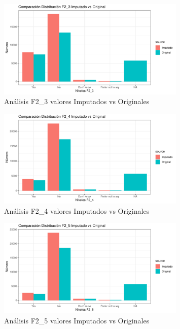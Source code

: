 \documentclass[a4paper, 11pt]{article}
\begin{document}
\begin{figure}[ht]
    \centering
    \includegraphics[width=0.8\textwidth]{images/Analysis_MV_F2_3.pdf} 
    \caption{Análisis F2\_3 valores Imputados vs Originales}
    \label{fig:Analysis_MV_F2_3}
\end{figure}

\begin{figure}[ht]
    \centering
    \includegraphics[width=0.8\textwidth]{images/Analysis_MV_F2_4.pdf} 
    \caption{Análisis F2\_4 valores Imputados vs Originales}
    \label{fig:Analysis_MV_F2_4}
\end{figure}

\begin{figure}[ht]
    \centering
    \includegraphics[width=0.8\textwidth]{images/Analysis_MV_F2_5.pdf} 
    \caption{Análisis F2\_5 valores Imputados vs Originales}
    \label{fig:Analysis_MV_F2_5}
\end{figure}
\end{document}
